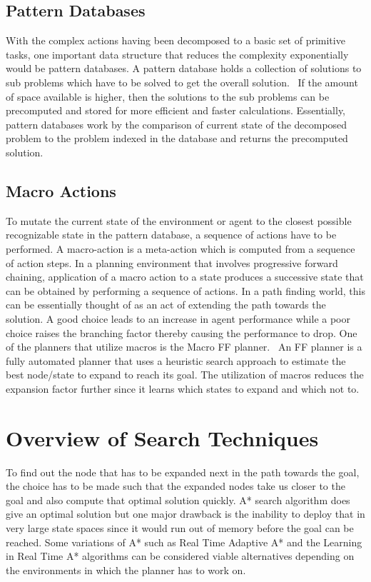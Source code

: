 \documentclass[tog]{acmsiggraph}
\begin{document}
\subsection{Pattern Databases}

With the complex actions having been decomposed to a basic set of
primitive tasks, one important data structure that reduces the
complexity exponentially would be pattern databases. A pattern
database holds a collection of solutions to sub problems which have to
be solved to get the overall solution.~\cite{korf2002disjoint} If the amount of space
available is higher, then the solutions to the sub problems can be
precomputed and stored for more efficient and faster calculations.
Essentially, pattern databases work by the comparison of current state
of the decomposed problem to the problem indexed in the database and
returns the precomputed solution.

\subsection{Macro Actions}

To mutate the current state of the environment or agent to the closest
possible recognizable state in the pattern database, a sequence of
actions have to be performed. A macro-action is a meta-action which is
computed from a sequence of action steps. In a planning environment
that involves progressive forward chaining, application of a macro
action to a state produces a successive state that can be obtained by
performing a sequence of actions. In a path finding world, this can be
essentially thought of as an act of extending the path towards the
solution. A good choice leads to an increase in agent performance
while a poor choice raises the branching factor thereby causing the
performance to drop. One of the planners that utilize macros is the
Macro FF planner.~\cite{botea2005macro} An FF planner is a fully automated planner that uses
a heuristic search approach to estimate the best node/state to expand
to reach its goal. The utilization of macros reduces the expansion
factor further since it learns which states to expand and which not
to.

\section{Overview of Search Techniques}

To find out the node that has to be expanded next in the path towards
the goal, the choice has to be made such that the expanded nodes take
us closer to the goal and also compute that optimal solution quickly.
A* search algorithm does give an optimal solution but one major
drawback is the inability to deploy that in very large state spaces
since it would run out of memory before the goal can be reached. Some
variations of A* such as Real Time Adaptive A* and the Learning in
Real Time A* algorithms can be considered viable alternatives
depending on the environments in which the planner has to work on.
\end{document}
